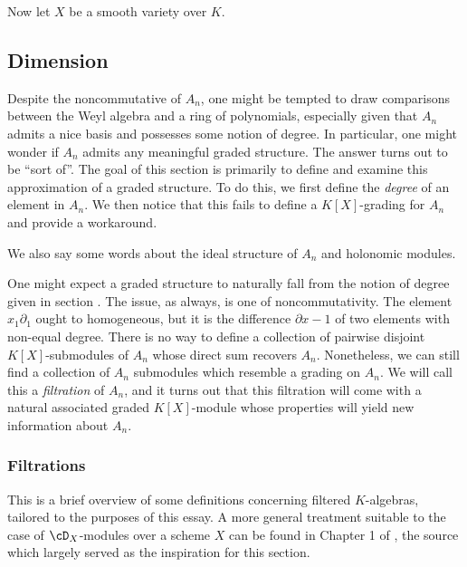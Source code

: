 Now let $X$ be a smooth variety over $K$.

\subsection{Dimension}

Despite the noncommutative of $A_n$, one might be tempted to draw comparisons between the Weyl algebra and a ring of polynomials, especially given that $A_n$ admits a nice basis and possesses some notion of degree. In particular, one might wonder if $A_n$ admits any meaningful graded structure. The answer turns out to be ``sort of''. The goal of this section is primarily to define and examine this approximation of a graded structure. To do this, we first define the \emph{degree} of an element in $A_n$. We then notice that this fails to define a $K[X]$-grading for $A_n$ and provide a workaround.

We also say some words about the ideal structure of $A_n$ and holonomic modules.

One might expect a graded structure to naturally fall from the notion of degree given in section . The issue, as always, is one of noncommutativity. The element $x_1\partial_1$ ought to homogeneous, but it is the difference $\partial x - 1$ of two elements with non-equal degree. There is no way to define a collection of pairwise disjoint $K[X]$-submodules of $A_n$ whose direct sum recovers $A_n$. Nonetheless, we can still find a collection of $A_n$ submodules which resemble a grading on $A_n$. We will call this a \emph{filtration} of $A_n$, and it turns out that this filtration will come with a natural associated graded $K[X]$-module whose properties will yield new information about $A_n$.

\subsubsection{Filtrations}

This is a brief overview of some definitions concerning filtered $K$-algebras, tailored to the purposes of this essay. A more general treatment suitable to the case of $\cD_X$-modules over a scheme $X$ can be found in Chapter 1 of \cite{ginzburg_d-mod}, the source which largely served as the inspiration for this section.

